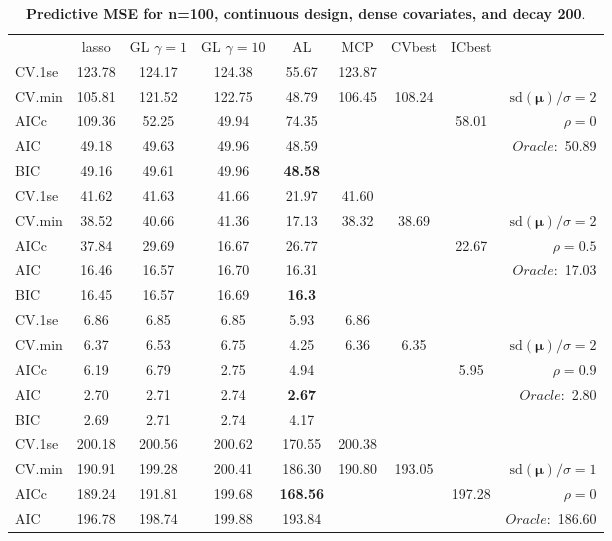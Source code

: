 \clearpage
\begin{table}\vspace{-.5cm}
\caption[l]{ { \bf Predictive MSE for n=100, continuous design, 
dense covariates, and  decay  200}.}
\vspace{-.5cm}
\footnotesize{}
\begin{center}
\begin{tabular}{l*{7}{c}|r}
 & lasso & GL $\gamma=1$ & GL $\gamma=10$ & AL & MCP  & CVbest & ICbest  \\
\cline{1-9}
CV.1se & 123.78 & 124.17 & 124.38 & 55.67 & 123.87 & & & \\
CV.min & 105.81 & 121.52 & 122.75 & 48.79 & 106.45 & 108.24 & & $\mathrm{sd}(\mathbf{\mu})/\sigma=2$ \\
AICc & 109.36 & 52.25 & 49.94 & 74.35 & & & 58.01 &  $\rho=0$ \\
AIC & 49.18 & 49.63 & 49.96 & 48.59 & & & &  \multirow{2}{*}{$Oracle: $ 50.89} \\
BIC & 49.16 & 49.61 & 49.96 & {\bf 48.58} & & & &  \\
 \hline 
CV.1se & 41.62 & 41.63 & 41.66 & 21.97 & 41.60 & & & \\
CV.min & 38.52 & 40.66 & 41.36 & 17.13 & 38.32 & 38.69 & & $\mathrm{sd}(\mathbf{\mu})/\sigma=2$ \\
AICc & 37.84 & 29.69 & 16.67 & 26.77 & & & 22.67 &  $\rho=0.5$ \\
AIC & 16.46 & 16.57 & 16.70 & 16.31 & & & &  \multirow{2}{*}{$Oracle: $ 17.03} \\
BIC & 16.45 & 16.57 & 16.69 & {\bf 16.3} & & & &  \\
 \hline 
CV.1se & 6.86 & 6.85 & 6.85 & 5.93 & 6.86 & & & \\
CV.min & 6.37 & 6.53 & 6.75 & 4.25 & 6.36 & 6.35 & & $\mathrm{sd}(\mathbf{\mu})/\sigma=2$ \\
AICc & 6.19 & 6.79 & 2.75 & 4.94 & & & 5.95 &  $\rho=0.9$ \\
AIC & 2.70 & 2.71 & 2.74 & {\bf 2.67} & & & &  \multirow{2}{*}{$Oracle: $ 2.80} \\
BIC & 2.69 & 2.71 & 2.74 & 4.17 & & & &  \\
 \hline 
CV.1se & 200.18 & 200.56 & 200.62 & 170.55 & 200.38 & & & \\
CV.min & 190.91 & 199.28 & 200.41 & 186.30 & 190.80 & 193.05 & & $\mathrm{sd}(\mathbf{\mu})/\sigma=1$ \\
AICc & 189.24 & 191.81 & 199.68 & {\bf 168.56} & & & 197.28 &  $\rho=0$ \\
AIC & 196.78 & 198.74 & 199.88 & 193.84 & & & &  \multirow{2}{*}{$Oracle: $ 186.60} \\

\end{tabular}
\end{center}
\end{table}
